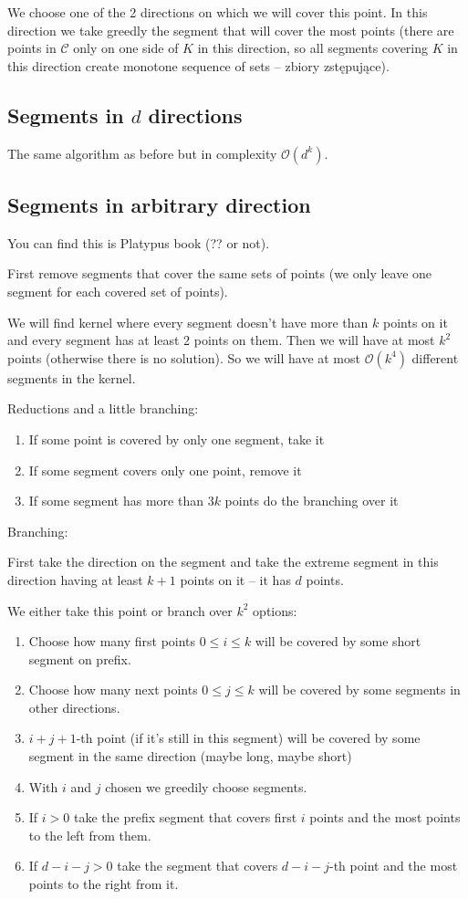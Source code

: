 \documentclass[en]{pracamgr}
\newcommand{\points}{\mathcal{C}}
\begin{document}
We choose one of the 2 directions on which we will cover this point.
In this direction we take greedly the segment that will cover
the most points (there are points in $\points$ only on
one side of $K$ in this direction, so all
segments covering $K$ in this direction create monotone sequence
of sets -- zbiory zstępujące).

\subsection{Segments in $d$ directions}
The same algorithm as before but in complexity $\mathcal{O}(d^k)$.

\subsection{Segments in arbitrary direction}
You can find this is Platypus book (?? or not).

First remove segments that cover the same sets of points
(we only leave one segment for each covered set of points).

We will find kernel where every segment doesn't have more than $k$
points on it and every segment has at least 2 points on them.
Then we will have at most $k^2$ points (otherwise there is no solution).
So we will have at most $\mathcal{O}(k^4)$ different segments
in the kernel.

Reductions and a little branching:
\begin{enumerate}
\item If some point is covered by only one segment, take it
\item If some segment covers only one point, remove it
\item If some segment has more than $3k$ points do the branching over it
\end{enumerate}

Branching:

First take the direction on the segment and take the extreme
segment in this direction having at least $k+1$ points on it
-- it has $d$ points.

We either take this point or branch over $k^2$ options:
\begin{enumerate}
\item Choose how many first points $0 \le i \le k$ will be covered
by some short segment on prefix.
\item Choose how many next points $0 \le j \le k$ will be covered
by some segments in other directions.
\item $i + j + 1$-th point (if it's still in this segment)
will be covered by some segment in the same direction (maybe long,
maybe short)
\item With $i$ and $j$ chosen we greedily choose segments.
\item If $i > 0$ take the prefix segment that covers first $i$ points
and the most points to the left from them.
\item If $d - i - j > 0$ take the segment that covers $d-i-j$-th point
and the most points to the right from it.
\end{enumerate}
\end{document}
